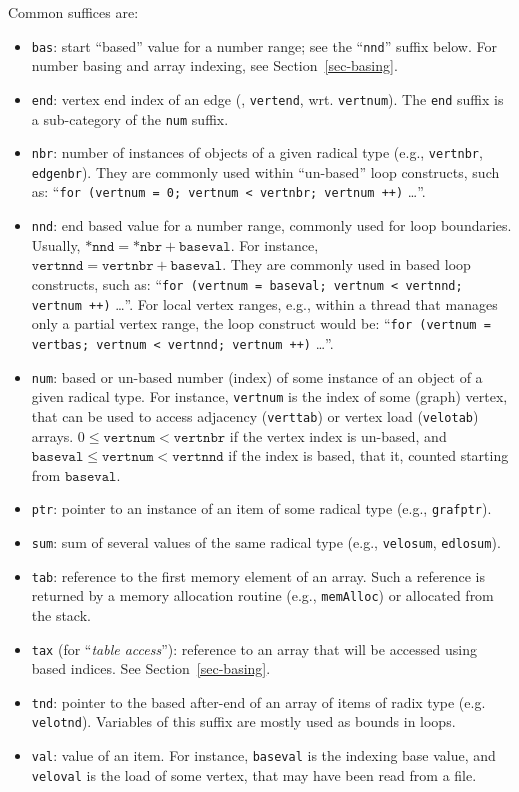 Common suffices are:
\begin{itemize}
\item
\texttt{bas}: start ``based'' value for a number range; see the
``\texttt{nnd}'' suffix below. For number basing and array indexing,
see Section~\ref{sec-basing}.
\item
\texttt{end}: vertex end index of an edge (\eg, \texttt{vertend},
wrt. \texttt{vertnum}). The \texttt{end} suffix is a sub-category of
the \texttt{num} suffix.
\item
\texttt{nbr}: number of instances of objects of a given radical
type (e.g., \texttt{vertnbr}, \texttt{edgenbr}). They are commonly
used within ``un-based'' loop constructs, such as:
``\texttt{for (vertnum = 0; vertnum < vertnbr; vertnum ++)} \ldots''.
\item
\texttt{nnd}: end based value for a number range, commonly used
for loop boundaries. Usually, $\mathtt{*nnd} =
\mathtt{*nbr} + \mathtt{baseval}$. For instance,
$\mathtt{vertnnd} = \mathtt{vertnbr} + \mathtt{baseval}$. They are
commonly used in based loop constructs, such as:
``\texttt{for (vertnum = baseval; vertnum < vertnnd; vertnum ++)}
\ldots''. For local vertex ranges, e.g., within a thread that manages
only a partial vertex range, the loop construct would be:
``\texttt{for (vertnum = vertbas; vertnum < vertnnd; vertnum ++)}
\ldots''.
\item
\texttt{num}: based or un-based number (index) of some instance of an
object of a given radical type. For instance, \texttt{vertnum} is the
index of some (graph) vertex, that can be used to access adjacency
(\texttt{verttab}) or vertex load (\texttt{velotab}) arrays.
$0 \leq \mathtt{vertnum} < \mathtt{vertnbr}$ if the
vertex index is un-based, and $\mathtt{baseval} \leq
\mathtt{vertnum} < \mathtt{vertnnd}$
if the index is based, that it, counted starting from
$\mathtt{baseval}$.
\item
\texttt{ptr}: pointer to an instance of an item of some radical type
(e.g., \texttt{grafptr}).
\item
\texttt{sum}: sum of several values of the same radical type (e.g.,
\texttt{velosum}, \texttt{edlosum}).
\item
\texttt{tab}: reference to the first memory element of an array. Such
a reference is returned by a memory allocation routine (e.g.,
\texttt{mem\lbt Alloc}) or allocated from the stack.
\item
\texttt{tax} (for ``\textit{table access}''): reference to an array
that will be accessed using based indices. See
Section~\ref{sec-basing}.
\item
\texttt{tnd}: pointer to the based after-end of an array of items
of radix type (e.g. \texttt{velotnd}). Variables of this suffix are
mostly used as bounds in loops.
\item
\texttt{val}: value of an item. For instance, \texttt{baseval} is the
indexing base value, and \texttt{veloval} is the load of some vertex,
that may have been read from a file.
\end{itemize}

